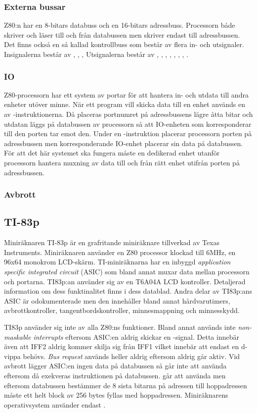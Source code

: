 \documentclass[main.tex]{subfiles}
\begin{document}
\subsubsection{Externa bussar}
Z80:n har en 8-bitars databuss och en 16-bitars adressbuss. Processorn både
skriver och läser till och från databussen men skriver endast till
adressbussen. Det finns också en så kallad kontrollbuss som består av flera in-
och utsignaler. Insignalerna består av , , ,  Utsignalerna består av , ,
, , , , , .

\subsubsection{IO}
Z80-processorn har ett system av portar för att hantera in- och utdata till
andra enheter utöver minne. När ett program vill skicka data till en enhet
används en av -instruktionerna. Då placeras portnumret på
adressbussens lägre åtta bitar och utdatan läggs på databussen av processorn så
att IO-enheten som korresponderar till den porten tar emot den. Under en
-instruktion placerar processorn porten på adressbussen men
korresponderande IO-enhet placerar sin data på databussen. För att det här
systemet ska fungera måste en dedikerad enhet utanför processorn hantera
muxning av data till och från rätt enhet utifrån porten på adressbussen.

\subsubsection{Avbrott}


\subsection{TI-83p}
Miniräknaren TI-83p är en grafritande miniräknare tillverkad av Texas
Instruments. Miniräknaren använder en Z80 processor klockad till 6MHz, en 96x64
monokrom LCD-skärm. TI-miniräknarna har en inbyggd {\it application specific
integrated circuit} (ASIC) som bland annat muxar data mellan processorn och
portarna. TI83p:an använder sig av en T6A04A LCD kontroller. Detaljerad
information om dess funktinalitet finns i dess datablad. Andra delar av
TI83p:ans ASIC är odokumenterade men den innehåller bland annat hårdvarutimers,
avbrottkontroller, tangentbordskontroller, minnesmappning och minnesskydd.

TI83p använder sig inte av alla Z80:ns funktioner. Bland annat används inte
{\it non-maskable interrupts} eftersom ASIC:en aldrig skickar en
-signal. Detta innebär även att IFF2 aldrig kommer skilja sig från
IFF1 vilket innebär att endast en d-vippa behövs. {\it Bus request} används
heller aldrig eftersom  aldrig går aktiv. Vid avbrott lägger
ASIC:en ingen data på databussen så  går inte att använda eftersom
då exekveras instruktionen på databussen.  går att använda men
eftersom databussen bestämmer de 8 sista bitarna på adressen till hoppadressen
måste ett helt block av 256 bytes fyllas med hoppadressen. Miniräknarens
operativsystem använder endast .

\clearpage
\end{document}
